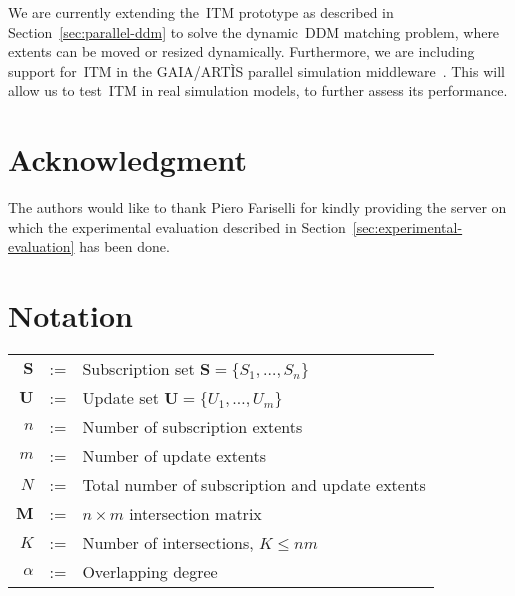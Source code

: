 \documentclass[10pt, conference, compsocconf]{IEEEtran}
\begin{document}
We are currently extending the~\ac{ITM} prototype as described in
Section~\ref{sec:parallel-ddm} to solve the dynamic~\ac{DDM} matching
problem, where extents can be moved or resized
dynamically. Furthermore, we are including support for~\ac{ITM} in the
GAIA/ART\`IS parallel simulation middleware~\cite{gda-dsrt-2004}. This
will allow us to test~\ac{ITM} in real simulation models, to further
assess its performance.

\section*{Acknowledgment}

The authors would like to thank Piero Fariselli for kindly providing
the server on which the experimental evaluation described in
Section~\ref{sec:experimental-evaluation} has been done.

\section*{Notation}

\begin{center}
\begin{tabular}{rcl}
$\mathbf{S}$ & := & Subscription set $\mathbf{S} = \{S_1, \ldots, S_n\}$ \\
$\mathbf{U}$ & := & Update set $\mathbf{U} = \{U_1, \ldots, U_m\}$ \\
$n$ & := & Number of subscription extents \\
$m$ & := & Number of update extents\\
$N$ & := & Total number of subscription and update extents\\
$\mathbf{M}$ & := & $n \times m$ intersection matrix\\
$K$ & := & Number of intersections, $K \leq nm$ \\
$\alpha$ & := & Overlapping degree\\
\end{tabular}
\end{center}
\end{document}
